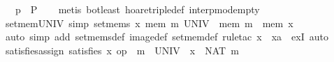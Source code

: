 \begin{isabellebody}
\isanewline
{}\isamarkupfalse%
\ {}{}{}\ {}\ p\ {}\ P{}\isanewline
%
\isadelimproof
\ \ %
\endisadelimproof
%
\isatagproof
{}\isamarkupfalse%
\ {}metis\ bot{}least\ hoare{}triple{}def\ interp{}mod{}empty{}%
\endisatagproof
{\isafoldproof}%
%
\isadelimproof
\isanewline
%
\endisadelimproof
\isanewline
{}\isamarkupfalse%
\ set{}mem{}UNIV\ {}simp{}{}\ {}set{}mems\ x\ {}{}mem{}\ m{}\ UNIV\ {}\ {}mem{}\ m\ {}\ mem\ x{}{}\isanewline
%
\isadelimproof
\ \ %
\endisadelimproof
%
\isatagproof
{}\isamarkupfalse%
\ {}auto\ simp\ add{}\ set{}mems{}def\ image{}def\ set{}mem{}def{}\ {}rule{}tac\ x\ {}\ xa\ \ exI{}\ auto{}%
\endisatagproof
{\isafoldproof}%
%
\isadelimproof
\isanewline
%
\endisadelimproof
\isanewline
{}\isamarkupfalse%
\ satisfies{}assign{}\ {}satisfies\ x\ {}op\ {}\ m{}\ {}\ UNIV\ {}\ x\ {}{}\ NAT\ m{}\isanewline

\end{isabellebody}
